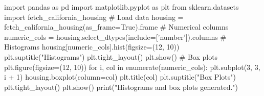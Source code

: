 import pandas as pd 
import matplotlib.pyplot as plt 
from sklearn.datasets import fetch_california_housing 
# Load data 
housing = fetch_california_housing(as_frame=True).frame 
# Numerical columns 
numeric_cols = housing.select_dtypes(include=['number']).columns 
# Histograms 
housing[numeric_cols].hist(figsize=(12, 10)) 
plt.suptitle("Histograms") 
plt.tight_layout() 
plt.show() 
# Box plots 
plt.figure(figsize=(12, 10)) 
for i, col in enumerate(numeric_cols): 
plt.subplot(3, 3, i + 1) 
housing.boxplot(column=col) 
plt.title(col) 
plt.suptitle("Box Plots") 
plt.tight_layout() 
plt.show() 
print("Histograms and box plots generated.")
